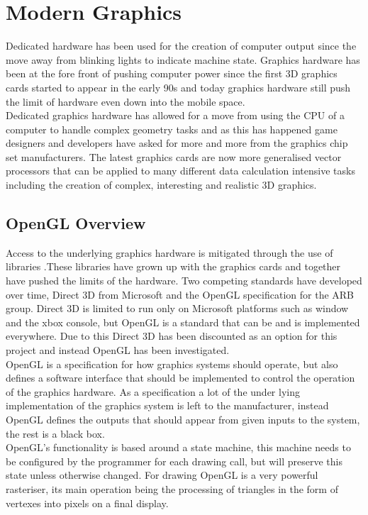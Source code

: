 \section{Modern Graphics}
Dedicated hardware has been used for the creation of computer output since the
move away from blinking lights to indicate machine state. Graphics hardware has
been at the fore front of pushing computer power since the first 3D graphics 
cards started to appear in the early 90s and today graphics hardware still push
the limit of hardware even down into the mobile space.\\

Dedicated graphics hardware has allowed for a move from using the CPU of a 
computer to handle complex geometry tasks and as this has happened game designers
and developers have asked for more and more from the graphics chip set
manufacturers. The latest graphics cards are now more generalised vector 
processors that can be applied to many different data calculation intensive tasks
including the creation of complex, interesting and realistic 3D graphics.\\

\subsection{OpenGL Overview} 
Access to the underlying graphics hardware is mitigated through the use of libraries
.These 
libraries have grown up with the graphics cards and together have pushed the 
limits of the hardware. Two competing standards have developed over time, Direct
3D from Microsoft and the OpenGL specification for the ARB group. Direct 3D is 
limited to run only on Microsoft platforms such as window and the xbox console,
but OpenGL is a standard that can be and is implemented everywhere. Due to this
Direct 3D has been discounted as an option for this project and instead OpenGL
has been investigated.\\

OpenGL is a specification for how graphics systems should operate, but also 
defines a software interface that should be implemented to control the operation
of the graphics hardware. As a specification a lot of the under lying 
implementation of the graphics system is left to the manufacturer, instead 
OpenGL defines the outputs that should appear from given inputs to the system,
the rest is a black box.\\

OpenGL's functionality is based around a state machine, this machine needs to be
configured by the programmer for each drawing call, but will preserve this state 
unless otherwise changed. For drawing OpenGL is a very powerful rasteriser, its
main operation being the processing of triangles in the form of vertexes into
pixels on a final display. \\

